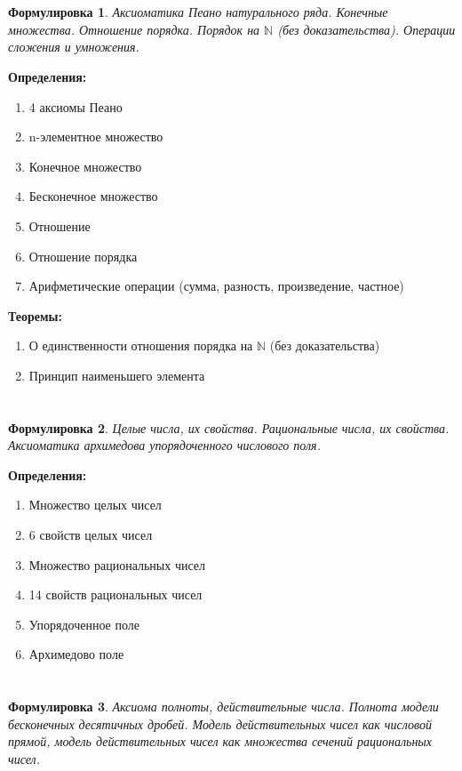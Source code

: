 \documentclass[a4paper]{article}
\newcommand{\N}{\mathbb{N}}
\theoremstyle{plain}
\newtheorem*{st}{Формулировка}
\theoremstyle{definition}
\theoremstyle{remark}
\begin{document}
\section{}
\begin{st}
    Аксиоматика Пеано натурального ряда. Конечные множества. Отношение порядка. Порядок на $\N$ (без доказательства). Операции сложения и умножения.
\end{st}

\textbf{Определения:}
\begin{enumerate}
    \item 4 аксиомы Пеано
    \item n-элементное множество
    \item Конечное множество
    \item Бесконечное множество
    \item Отношение
    \item Отношение порядка
    \item Арифметические операции (сумма, разность, произведение, частное)
\end{enumerate}

\textbf{Теоремы:}
\begin{enumerate}
    \item О единственности отношения порядка на $\N$ (без доказательства)
    \item Принцип наименьшего элемента
\end{enumerate}


\section{}
\begin{st}
    Целые числа, их свойства. Рациональные числа, их свойства. Аксиоматика архимедова упорядоченного числового поля.
\end{st}

\textbf{Определения:}
\begin{enumerate}
    \item Множество целых чисел
    \item 6 свойств целых чисел
    \item Множество рациональных чисел
    \item 14 свойств рациональных чисел
    \item Упорядоченное поле
    \item Архимедово поле
\end{enumerate}


\section{}
\begin{st}
    Аксиома полноты, действительные числа. Полнота модели бесконечных десятичных дробей. Модель действительных чисел как числовой прямой, модель действительных чисел как множества сечений рациональных чисел.
\end{st}
\end{document}
